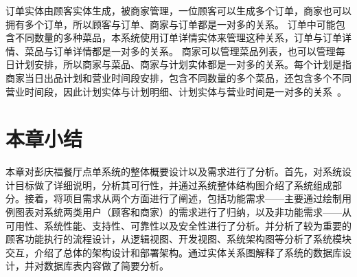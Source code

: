 订单实体由顾客实体生成，被商家管理，一位顾客可以生成多个订单，商家也可以拥有多个订单，所以顾客与订单、商家与订单都是一对多的关系。
订单中可能包含不同数量的多种菜品，本系统使用订单详情实体来管理这种关系，订单与订单详情、菜品与订单详情都是一对多的关系。
商家可以管理菜品列表，也可以管理每日计划安排，所以商家与菜品、商家与计划实体都是一对多的关系。每个计划是指商家当日出品计划和营业时间段安排，包含不同数量的多个菜品，还包含多个不同营业时间段，因此计划实体与计划明细、计划实体与营业时间是一对多的关系~\cite{ssh2019}。

\section{本章小结}
本章对彭庆福餐厅点单系统的整体概要设计以及需求进行了分析。首先，对系统设计目标做了详细说明，分析其可行性，并通过系统整体结构图介绍了系统组成部分。接着，将项目需求从两个方面进行了阐述，包括功能需求——主要通过绘制用例图表对系统两类用户（顾客和商家）的需求进行了归纳，以及非功能需求——从可用性、系统性能、支持性、可靠性以及安全性进行了分析。并分析了较为重要的顾客功能执行的流程设计，从逻辑视图、开发视图、系统架构图等分析了系统模块交互，介绍了总体的架构设计和部署架构。通过实体关系图解释了系统的数据库设计，并对数据库表内容做了简要分析。